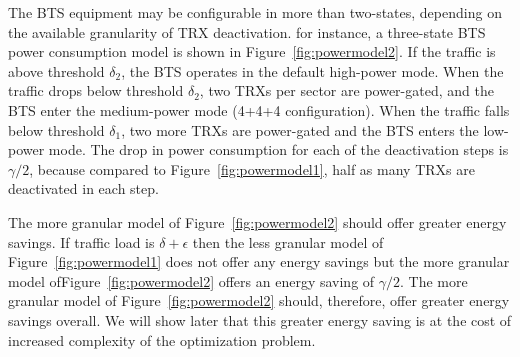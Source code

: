The BTS equipment may be configurable in more than two-states, depending on the available granularity of TRX deactivation. for instance, a three-state BTS power consumption model is shown in Figure~\ref{fig:powermodel2}. If the traffic is above threshold $\delta_2$, the BTS operates in the default high-power mode. When the traffic drops below threshold $\delta_2$, two TRXs per sector are power-gated, and the BTS enter the medium-power mode (4+4+4 configuration). When the traffic falls below threshold $\delta_1$, two more TRXs are power-gated and the BTS enters the low-power mode. The drop in power consumption for each of the deactivation steps is $\gamma/2$, because compared to Figure~\ref{fig:powermodel1}, half as many TRXs are deactivated in each step.

The more granular model of Figure~\ref{fig:powermodel2} should offer greater energy savings. If traffic load is $\delta + \epsilon$ then the less granular model of Figure~\ref{fig:powermodel1} does not offer any energy savings but the more granular model ofFigure~\ref{fig:powermodel2} offers an energy saving of $\gamma/2$. The more granular model of Figure~\ref{fig:powermodel2} should, therefore, offer greater energy savings overall. We will show later that this greater energy saving is at the cost of increased complexity of the optimization problem.  

